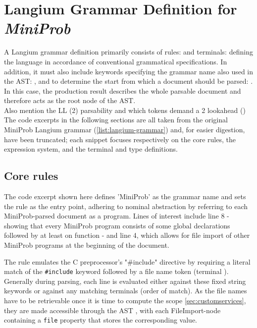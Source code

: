 \section{Langium Grammar Definition for \textit{MiniProb}}

A Langium grammar definition primarily consists of rules:  and terminals:  defining the language
in accordance of conventional grammatical specifications. In addition, it must also include keywords specifying the grammar name also used in the AST: ,
and to determine the start from which a document should be parsed: .
In this case, the production result describes the whole parsable document and therefore acts as the root node of the AST.
\\
Also mention the LL (2) parsability and which tokens demand a 2 lookahead ()
The code excerpts in the following sections are all taken from the original MiniProb Langium grammar (\ref{list:langium-grammar}) and, for easier digestion,
have been truncated; each snippet focuses respectively on the core rules, the expression system, and the terminal and type definitions.
\subsection*{Core rules}

The code excerpt shown here defines 'MiniProb' as the grammar name and sets the  rule as the entry point, adhering to nominal abstraction by
referring to each MiniProb-parsed document as a program. Lines of interest include line 8 - showing that every MiniProb program consists of some global declarations
followed by at least on function - and line 4, which allows for file import of other MiniProb programs at the beginning of the document.

The  rule emulates the C preprocessor's "\#include" directive by requiring a literal match of the \texttt{\#include} keyword followed by a
file name token (terminal ). Generally during parsing, each line is evaluated either against these fixed string keywords or against any matching terminals (order of match).
As the file names have to be retrievable once it is time to compute the scope \ref{sec:customservices}, they are made accessible through the AST
, with each FileImport-node containing a \texttt{file} property that stores the corresponding value.

